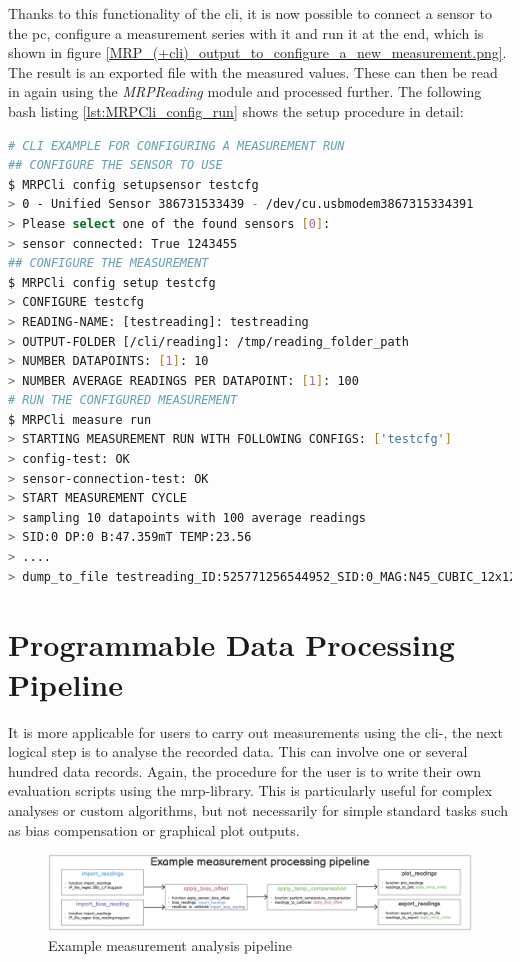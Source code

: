 Thanks to this functionality of the \gls{cli}, it is now possible to
connect a sensor to the \gls{pc}, configure a measurement series with it
and run it at the end, which is shown in figure
\ref{MRP_(+cli)_output_to_configure_a_new_measurement.png}. The result
is an exported file with the measured values. These can then be read in
again using the \emph{MRPReading} module and processed further. The
following bash listing \ref{lst:MRPCli_config_run} shows the setup
procedure in detail:

\begin{lstlisting}[language=bash, caption={MRPCli example usage for configuration of a measurement run}, label=lst:MRPCli_config_run]
# CLI EXAMPLE FOR CONFIGURING A MEASUREMENT RUN
## CONFIGURE THE SENSOR TO USE
$ MRPCli config setupsensor testcfg
> 0 - Unified Sensor 386731533439 - /dev/cu.usbmodem3867315334391
> Please select one of the found sensors [0]:
> sensor connected: True 1243455
## CONFIGURE THE MEASUREMENT
$ MRPCli config setup testcfg
> CONFIGURE testcfg
> READING-NAME: [testreading]: testreading
> OUTPUT-FOLDER [/cli/reading]: /tmp/reading_folder_path
> NUMBER DATAPOINTS: [1]: 10
> NUMBER AVERAGE READINGS PER DATAPOINT: [1]: 100
# RUN THE CONFIGURED MEASUREMENT
$ MRPCli measure run
> STARTING MEASUREMENT RUN WITH FOLLOWING CONFIGS: ['testcfg']
> config-test: OK
> sensor-connection-test: OK
> START MEASUREMENT CYCLE
> sampling 10 datapoints with 100 average readings
> SID:0 DP:0 B:47.359mT TEMP:23.56
> ....
> dump_to_file testreading_ID:525771256544952_SID:0_MAG:N45_CUBIC_12x12x12mm.mag.json
\end{lstlisting}

\hypertarget{programmable-data-processing-pipeline}{%
\section{Programmable Data Processing
Pipeline}\label{programmable-data-processing-pipeline}}

It is more applicable for users to carry out measurements using the
\gls{cli}-, the next logical step is to analyse the recorded data. This
can involve one or several hundred data records. Again, the procedure
for the user is to write their own evaluation scripts using the
\gls{mrp}-library. This is particularly useful for complex analyses or
custom algorithms, but not necessarily for simple standard tasks such as
bias compensation or graphical plot outputs.

\begin{figure}
\centering
\includegraphics{./generated_images/border_Example_measurement_analysis_pipeline.png}
\caption{Example measurement analysis pipeline
\label{Example_measurement_analysis_pipeline.png}}
\end{figure}

